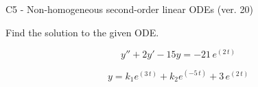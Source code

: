 \begin{exercise}
  \begin{exerciseTitle}C5 - Non-homogeneous second-order linear ODEs (ver. 20)\end{exerciseTitle}
  \begin{exerciseStatement}
    
Find the solution to the given ODE.

    
\[y''+2y'-15y = -21 \, e^{\left(2 \, t\right)}\]

  \end{exerciseStatement}
  \begin{exerciseAnswer}
    
\[y= k_{1} e^{\left(3 \, t\right)} + k_{2} e^{\left(-5 \, t\right)} + 3 \, e^{\left(2 \, t\right)}\]

  \end{exerciseAnswer}
\end{exercise}